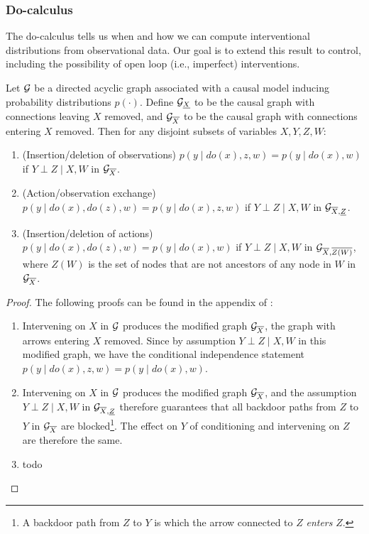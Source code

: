 \subsubsection{Do-calculus}

The do-calculus tells us when and how we can compute interventional distributions from observational data. Our goal is to extend this result to control, including the possibility of open loop (i.e., imperfect) interventions.

\begin{theorem}
    \label{thm:do-calculus}
    Let $\mathcal{G}$ be a directed acyclic graph associated with a causal model inducing probability distributions $p(\cdot)$. Define $\mathcal{G}_{\underline{X}}$ to be the causal graph with connections leaving $X$ removed, and $\mathcal{G}_{\overline{X}}$ to be the causal graph with connections entering $X$ removed. Then for any disjoint subsets of variables $X, Y, Z, W$:
    \begin{enumerate}
        \item (Insertion/deletion of observations) $p(y \mid do(x), z, w) = p(y \mid do(x), w)$ if $Y \perp Z \mid X, W$ in $\mathcal{G}_{\overline{X}}$.
        \item (Action/observation exchange) $p(y \mid do(x), do(z), w) = p(y \mid do(x), z, w)$ if $Y \perp Z \mid X, W$ in $\mathcal{G}_{\overline{X},\underline{Z}}$.
        \item (Insertion/deletion of actions) $p(y \mid do(x), do(z), w) = p(y \mid do(x), w)$ if $Y \perp Z \mid X, W$ in $\mathcal{G}_{\overline{X},\overline{Z(W)}}$, where $Z(W)$ is the set of nodes that are not ancestors of any node in $W$ in $\mathcal{G}_{\overline{X}}$.
    \end{enumerate}
\end{theorem}

\begin{proof} The following proofs can be found in the appendix of \cite{pearl1995causal}:
    \begin{enumerate}
        \item Intervening on $X$ in $\mathcal{G}$ produces the modified graph $\mathcal{G}_{\overline{X}}$, the graph with arrows entering $X$ removed. Since by assumption $Y \perp Z \mid X, W$ in this modified graph, we have the conditional independence statement $p(y \mid do(x), z, w) = p(y \mid do(x), w)$.
        \item Intervening on $X$ in $\mathcal{G}$ produces the modified graph $\mathcal{G}_{\overline{X}}$, and the assumption $Y \perp Z \mid X, W$ in $\mathcal{G}_{\overline{X},\underline{Z}}$ therefore guarantees that all backdoor paths from $Z$ to $Y$ in $\mathcal{G}_{\overline{X}}$ are blocked\footnote{A backdoor path from $Z$ to $Y$ is which the arrow connected to $Z$ \emph{enters} $Z$.}. The effect on $Y$ of conditioning and intervening on $Z$ are therefore the same.
        \item todo
    \end{enumerate}
\end{proof}

